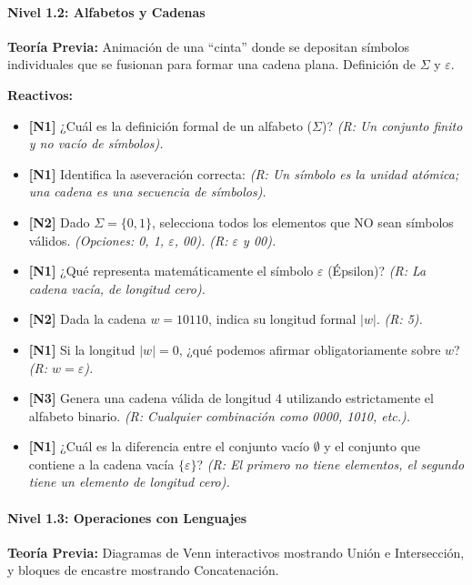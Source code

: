\paragraph{Nivel 1.2: Alfabetos y Cadenas}

\textbf{Teoría Previa:} Animación de una ``cinta'' donde se depositan símbolos individuales que se
fusionan para formar una cadena plana. Definición de $\Sigma$ y $\varepsilon$.

\textbf{Reactivos:}
\begin{itemize}
    \item \textbf{[N1]} ¿Cuál es la definición formal de un alfabeto ($\Sigma$)? \textit{(R: Un
    conjunto finito y no vacío de símbolos).}
    \item \textbf{[N1]} Identifica la aseveración correcta: \textit{(R: Un símbolo es la unidad
    atómica; una cadena es una secuencia de símbolos).}
    \item \textbf{[N2]} Dado $\Sigma = \{0, 1\}$, selecciona todos los elementos que NO sean
    símbolos válidos. \textit{(Opciones: 0, 1, $\varepsilon$, 00). (R: $\varepsilon$ y 00).}
    \item \textbf{[N1]} ¿Qué representa matemáticamente el símbolo $\varepsilon$ (Épsilon)?
    \textit{(R: La cadena vacía, de longitud cero).}
    \item \textbf{[N2]} Dada la cadena $w = 10110$, indica su longitud formal $|w|$.
    \textit{(R: 5).}
    \item \textbf{[N1]} Si la longitud $|w| = 0$, ¿qué podemos afirmar obligatoriamente sobre $w$?
    \textit{(R: $w = \varepsilon$).}
    \item \textbf{[N3]} Genera una cadena válida de longitud 4 utilizando estrictamente el alfabeto
    binario. \textit{(R: Cualquier combinación como 0000, 1010, etc.).}
    \item \textbf{[N1]} ¿Cuál es la diferencia entre el conjunto vacío $\emptyset$ y el conjunto
    que contiene a la cadena vacía $\{\varepsilon\}$? \textit{(R: El primero no tiene elementos,
    el segundo tiene un elemento de longitud cero).}
\end{itemize}

\paragraph{Nivel 1.3: Operaciones con Lenguajes}

\textbf{Teoría Previa:} Diagramas de Venn interactivos mostrando Unión e Intersección, y bloques
de encastre mostrando Concatenación.

